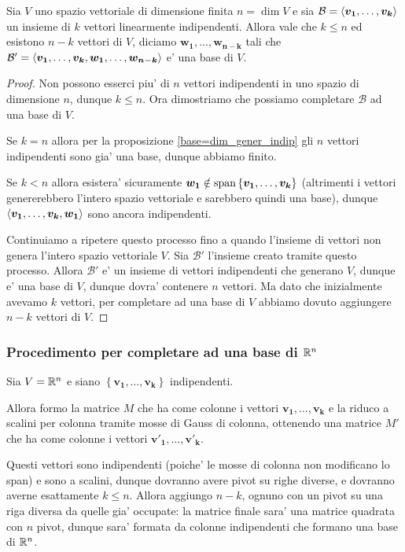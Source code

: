 \begin{theorem}
     \label{th_completamento}
    Sia $V$ uno spazio vettoriale di dimensione finita $n = \dim V$ e sia $\mathcal{B} = \left\langle \bm{v_1}, \dots, \bm{v_k} \right\rangle$ un insieme di $k$ vettori linearmente indipendenti. Allora vale che $k \leq n$ ed esistono $n - k$ vettori di $V$, diciamo ${\bm{w_1}, \dots, \bm{w_{n-k}}}$ tali che $\mathcal{B}' = \left\langle \bm{v_1}, \dots, \bm{v_k}, \bm{w_1}, \dots, \bm{w_{n-k}} \right\rangle$ e' una base di $V$.
\end{theorem}
\begin{proof}
    Non possono esserci piu' di $n$ vettori indipendenti in uno spazio di dimensione $n$, dunque $k \leq n$. Ora dimostriamo che possiamo completare $\mathcal{B}$ ad una base di $V$.

    Se $k = n$ allora per la proposizione \ref{base=dim_gener_indip} gli $n$ vettori indipendenti sono gia' una base, dunque abbiamo finito.

    Se $k < n$ allora esistera' sicuramente $\bm{w_1} \notin \operatorname{span}\left\{\bm{v_1}, \dots, \bm{v_k}\right\}$ (altrimenti i vettori genererebbero l'intero spazio vettoriale e sarebbero quindi una base), dunque $\left\langle \bm{v_1}, \dots, \bm{v_k}, \bm{w_1} \right\rangle$ sono ancora indipendenti.
    
    Continuiamo a ripetere questo processo fino a quando l'insieme di vettori non genera l'intero spazio vettoriale $V$. Sia $\mathcal{B}'$ l'insieme creato tramite questo processo. Allora $\mathcal{B}'$ e' un insieme di vettori indipendenti che generano $V$, dunque e' una base di $V$, dunque dovra' contenere $n$ vettori. Ma dato che inizialmente avevamo $k$ vettori, per completare ad una base di $V$ abbiamo dovuto aggiungere $n-k$ vettori di $V$.
\end{proof}

\subsubsection{Procedimento per completare ad una base di $\mathbb{R}^n$}

Sia $V = \mathbb{R}^n$ e siano $\left\{ \bm{v_1}, \dots, \bm{v_k} \right\}$ indipendenti.

Allora formo la matrice $M$ che ha come colonne i vettori $\bm{v_1}, \dots, \bm{v_k}$ e la riduco a scalini per colonna tramite mosse di Gauss di colonna, ottenendo una matrice $M'$ che ha come colonne i vettori $\bm{v'_1}, \dots, \bm{v'_k}$.

Questi vettori sono indipendenti (poiche' le mosse di colonna non modificano lo span) e sono a scalini, dunque dovranno avere pivot su righe diverse, e dovranno averne esattamente $k \leq n$. Allora aggiungo $n - k$, ognuno con un pivot su una riga diversa da quelle gia' occupate: la matrice finale sara' una matrice quadrata con $n$ pivot, dunque sara' formata da colonne indipendenti che formano una base di $\mathbb{R}^n$.

